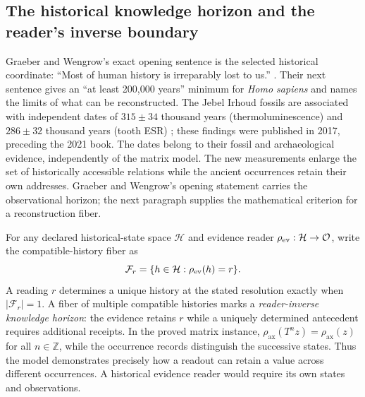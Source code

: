 \documentclass[10pt,letterpaper]{article}
\theoremstyle{definition}\newtheorem{definition}[theorem]{Definition}
\newcommand{\ZZ}{\mathbb Z}
\newcommand{\rhoax}{\rho_{\mathrm{ax}}}
\begin{document}
\subsection*{The historical knowledge horizon and the reader's inverse boundary}
Graeber and Wengrow's exact opening sentence is the selected historical coordinate: ``Most of human history is irreparably lost to us.'' \cite{graeberwengrow}. Their next sentence gives an ``at least 200,000 years'' minimum for \emph{Homo sapiens} and names the limits of what can be reconstructed. The Jebel Irhoud fossils are associated with independent dates of $315\pm34$ thousand years (thermoluminescence) and $286\pm32$ thousand years (tooth ESR) \cite{hublin2017,richter2017}; these findings were published in 2017, preceding the 2021 book. The dates belong to their fossil and archaeological evidence, independently of the matrix model. The new measurements enlarge the set of historically accessible relations while the ancient occurrences retain their own addresses. Graeber and Wengrow's opening statement carries the observational horizon; the next paragraph supplies the mathematical criterion for a reconstruction fiber.

For any declared historical-state space $\mathcal H$ and evidence reader $\rho_{\rm ev}:\mathcal H\to\mathcal O$, write the compatible-history fiber as
\begin{equation}\label{eq:horizonfiber}
 \mathcal F_r=\{h\in\mathcal H:\rho_{\rm ev}(h)=r\}.
\end{equation}
A reading $r$ determines a unique history at the stated resolution exactly when $|\mathcal F_r|=1$. A fiber of multiple compatible histories marks a \emph{reader-inverse knowledge horizon}: the evidence retains $r$ while a uniquely determined antecedent requires additional receipts. In the proved matrix instance, $\rhoax(T^nz)=\rhoax(z)$ for all $n\in\ZZ$, while the occurrence records distinguish the successive states. Thus the model demonstrates precisely how a readout can retain a value across different occurrences. A historical evidence reader would require its own states and observations.
\end{document}
